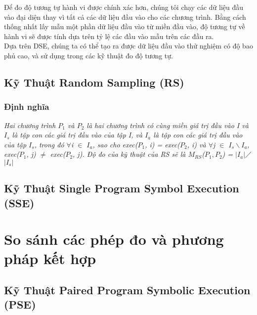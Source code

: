 Để đo độ tương tự hành vi được chính xác hơn, chúng tôi chạy các dữ liệu đầu vào đại diện thay vì tất cả các dữ liệu đầu vào cho các chương trình. Bằng cách thống nhất lấy mẫu một phần dữ liệu đầu vào từ miền đầu vào, độ tương tự về hành vi sẽ được tính dựa trên tỷ lệ các đầu vào mẫu trên các đầu ra. \\
	
Dựa trên DSE, chúng ta có thể tạo ra được dữ liệu đầu vào thử nghiệm có độ bao phủ cao, và sử dụng trong các kỹ thuật đo độ tương tự. \\

\subsection{Kỹ Thuật Random Sampling (RS)}
	\subsubsection{Định nghĩa}
	\textit{Hai chương trình $P_{1}$ và $P_{2}$ là hai chương trình có cùng miền giá trị đầu vào I và $I_{s}$ là tập con các giá trị đầu vào của tập I, và  $I_{a}$ là tập con các giá trị đầu vào của tập $I_{s}$, trong đó $\forall$i $\in$ $I_{a}$, sao cho exec($P_{1}$, i) = exec($P_{2}$, i) và $\forall$j $\in$ $I_{s} \backslash I_{a}$, exec($P_{1}$, j) $\neq$ exec($P_{2}$, j). Độ đo của kỹ thuật của RS sẽ là $M_{RS}$($P_{1},P_{2}$) = $\left|I_{a}\right|$$\diagup$$\left|I_{s}\right|$}
	
	
\subsection{Kỹ Thuật Single Program Symbol Execution (SSE)}


\section{So sánh các phép đo và phương pháp kết hợp}
\subsection{Kỹ Thuật Paired Program Symbolic Execution (PSE)}
	

	